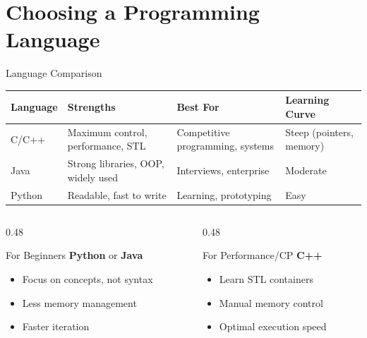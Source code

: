 \documentclass[aspectratio=169,xcolor=dvipsnames]{beamer}
\begin{document}
\section{Choosing a Programming Language}

\begin{frame}{Language Comparison}
  \begin{center}
    \begin{tabular}{l|p{3cm}|p{3.5cm}|p{3cm}}
      \toprule
      \textbf{Language} & \textbf{Strengths} & \textbf{Best For} & \textbf{Learning Curve} \\
      \midrule
      C/C++ & Maximum control, performance, STL & Competitive programming, systems & Steep (pointers, memory) \\
      \midrule
      Java & Strong libraries, OOP, widely used & Interviews, enterprise & Moderate \\
      \midrule
      Python & Readable, fast to write & Learning, prototyping & Easy \\
      \bottomrule
    \end{tabular}
  \end{center}

  \vspace{0.5cm}

  \begin{columns}
    \begin{column}{0.48\textwidth}
      \begin{block}{For Beginners}
        \textbf{Python} or \textbf{Java}
        \begin{itemize}
          \item Focus on concepts, not syntax
          \item Less memory management
          \item Faster iteration
        \end{itemize}
      \end{block}
    \end{column}
    \begin{column}{0.48\textwidth}
      \begin{block}{For Performance/CP}
        \textbf{C++}
        \begin{itemize}
          \item Learn STL containers
          \item Manual memory control
          \item Optimal execution speed
        \end{itemize}
      \end{block}
    \end{column}
  \end{columns}
\end{frame}
\end{document}
